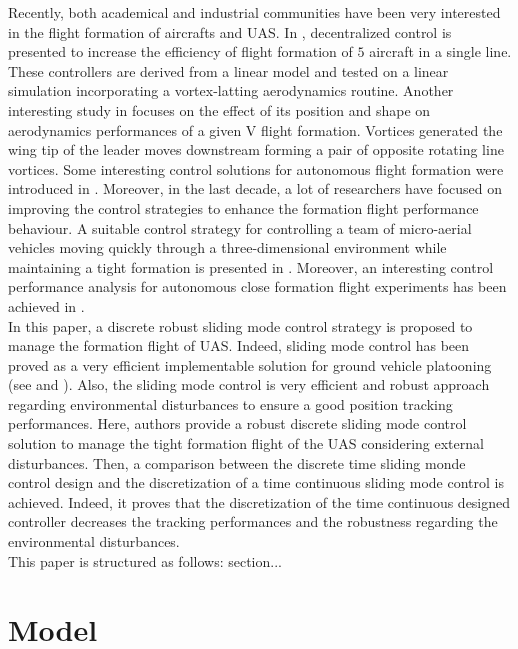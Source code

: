 \documentclass{ifacconf}
\begin{document}
Recently, both academical and industrial communities have been very interested in the flight formation of aircrafts and UAS. In \cite{wolfe1996decentralized}, decentralized control is presented to increase the efficiency of flight formation of $5$ aircraft in a single line. These controllers are derived from a linear model and tested on a linear simulation incorporating a vortex-latting aerodynamics routine. Another interesting study in \cite{thien2008effects} focuses on the effect of its position and shape on aerodynamics performances of a given V flight formation. Vortices generated the wing tip of the leader moves downstream forming a pair of opposite rotating line vortices. Some interesting control solutions for autonomous flight formation were introduced in \cite{giulietti2000autonomous}. Moreover, in the last decade, a lot of researchers have focused on improving the control strategies to enhance the formation flight performance behaviour. A suitable control strategy for  controlling a team of micro-aerial vehicles moving quickly through a three-dimensional environment while maintaining a tight formation is presented in \cite{turpin2012trajectory}. Moreover, an interesting control performance analysis for autonomous close formation flight experiments has been achieved in \cite{rice2014control}.\\
In this paper, a discrete robust sliding mode control strategy is proposed to manage the formation flight of UAS. Indeed, sliding mode control has been proved as a very efficient implementable solution for ground vehicle platooning (see \cite{ferrara2008sliding} and \cite{zou2013distributed}). Also, the sliding mode control is very efficient and robust approach regarding environmental disturbances to ensure a good position tracking performances. Here, authors provide a robust discrete sliding mode control solution to manage the tight formation flight of the UAS considering external disturbances. Then, a comparison between the discrete time sliding monde control design and the discretization of a time continuous sliding mode control is achieved. Indeed, it proves that the discretization of the time continuous designed controller decreases the tracking performances and the robustness regarding the environmental disturbances.\\
This paper is structured as follows: section...


\section{Model}
\end{document}
